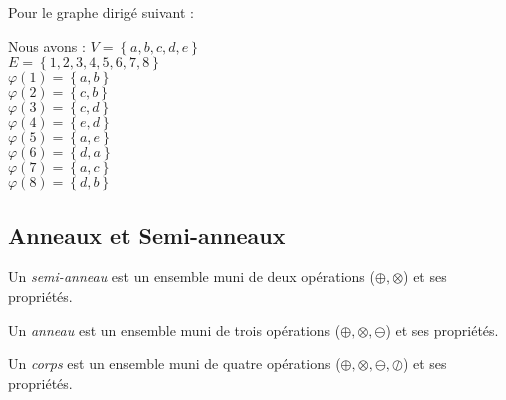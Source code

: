 \begin{myexem}
Pour le graphe dirigé suivant :
  \begin{center}
  \end{center}
	Nous avons :
	$V=\left\{a,b,c,d,e\right\}$\\
	$E=\left\{1,2,3,4,5,6,7,8\right\}$\\
	$\varphi(1)=\left\{a,b\right\}$\\
	$\varphi(2)=\left\{c,b\right\}$\\
	$\varphi(3)=\left\{c,d\right\}$\\
	$\varphi(4)=\left\{e,d\right\}$\\
	$\varphi(5)=\left\{a,e\right\}$\\
	$\varphi(6)=\left\{d,a\right\}$\\
	$\varphi(7)=\left\{a,c\right\}$\\
	$\varphi(8)=\left\{d,b\right\}$\\

\end{myexem}

\subsection{Anneaux et Semi-anneaux}
\begin{mydef}
  Un \emph{semi-anneau} est un ensemble muni de deux opérations ($\oplus,\otimes$) et ses propriétés.
\end{mydef}

\begin{mydef}
  Un \emph{anneau} est un ensemble muni de trois opérations ($\oplus,\otimes,\ominus$) et ses propriétés.
\end{mydef}

\begin{mydef}
  Un \emph{corps} est un ensemble muni de quatre opérations ($\oplus,\otimes,\ominus,\oslash$) et ses propriétés.
\end{mydef}

